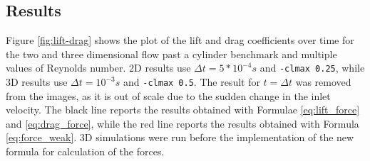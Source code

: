 \subsection{Results}\label{sec:lift_drag_plots}
Figure \ref{fig:lift-drag} shows the plot of the lift and drag coefficients over time for the two and three dimensional flow past a cylinder benchmark and multiple values of Reynolds number. 2D results use $\Delta t = 5*10^{-4}s$ and \texttt{-clmax 0.25}, while 3D results use $\Delta t = 10^{-3}s$ and \texttt{-clmax 0.5}. The result for $t = \Delta t$ was removed from the images, as it is out of scale due to the sudden change in the inlet velocity. The black line reports the results obtained with Formulae \ref{eq:lift_force} and \ref{eq:drag_force}, while the red line reports the results obtained with Formula \ref{eq:force_weak}. 3D simulations were run before the implementation of the new formula for calculation of the forces.

